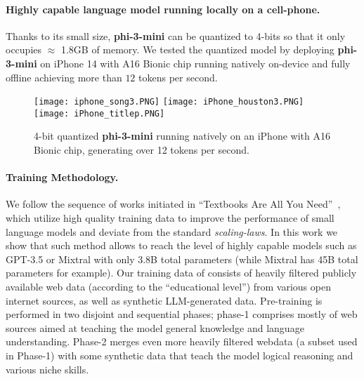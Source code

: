 \paragraph{Highly capable language model running locally on a cell-phone.} Thanks to its small size, \textbf{phi-3-mini} can be quantized to 4-bits so that it only occupies $\approx$ 1.8GB of memory. We tested the quantized model by deploying \textbf{phi-3-mini} on iPhone 14 with A16 Bionic chip running natively on-device and fully offline achieving more than $12$ tokens per second.

\begin{figure}
    \centering
    \texttt{[image: iphone\_song3.PNG]}
\texttt{[image: iPhone\_houston3.PNG]}
\texttt{[image: iPhone\_titlep.PNG]}
    \caption{4-bit quantized \textbf{phi-3-mini} running natively on an iPhone with A16 Bionic chip, generating over 12 tokens per second.}
    \label{fig:1}
\end{figure}

\paragraph{Training Methodology.} We follow the sequence of works initiated in ``Textbooks Are All You Need''~\cite{gunasekar2023textbooks}, which utilize high quality training data to improve the performance of small language models and deviate from the standard {\em scaling-laws}. In this work we show that such method allows to reach the level of highly capable models such as GPT-3.5 or Mixtral with only 3.8B total parameters (while Mixtral has 45B total parameters for example). Our training data of consists of heavily filtered publicly available web data (according to the ``educational level'') from various open internet sources, as well as synthetic LLM-generated data. Pre-training is performed in two disjoint and sequential phases; phase-1 comprises mostly of web sources aimed at teaching the model general knowledge and language understanding. Phase-2 merges even more heavily filtered webdata (a subset used in Phase-1) with some synthetic data that teach the model logical reasoning and various niche skills. 

